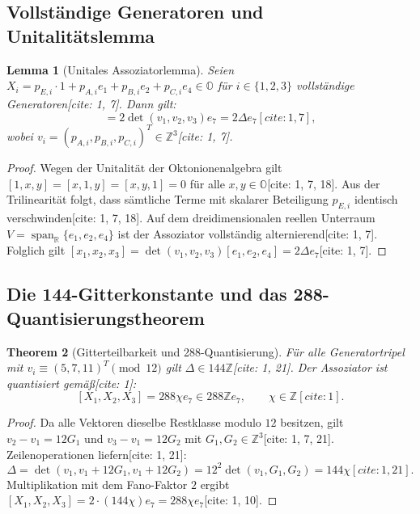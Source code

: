 \documentclass[11pt,a4paper]{article}
\newtheorem{theorem}{Theorem}[section]
\newtheorem{lemma}[theorem]{Lemma}
\theoremstyle{definition}
\theoremstyle{remark}
\begin{document}
\subsection{Vollständige Generatoren und Unitalitätslemma}
\begin{lemma}[Unitales Assoziatorlemma]
Seien $X_i = p_{E,i} \cdot 1 + p_{A,i} e_1 + p_{B,i} e_2 + p_{C,i} e_4 \in \mathbb{O}$ für $i \in \{1, 2, 3\}$ vollständige Generatoren[cite: 1, 7]. Dann gilt:
\begin{equation}
[X_1, X_2, X_3] = 2 \det(v_1, v_2, v_3) e_7 = 2\Delta e_7[cite: 1, 7],
\end{equation}
wobei $v_i = (p_{A,i}, p_{B,i}, p_{C,i})^T \in \mathbb{Z}^3$[cite: 1, 7].
\end{lemma}
\begin{proof}
Wegen der Unitalität der Oktonionenalgebra gilt $[1, x, y] = [x, 1, y] = [x, y, 1] = 0$ für alle $x, y \in \mathbb{O}$[cite: 1, 7, 18]. Aus der Trilinearität folgt, dass sämtliche Terme mit skalarer Beteiligung $p_{E,i}$ identisch verschwinden[cite: 1, 7, 18]. Auf dem dreidimensionalen reellen Unterraum $V = \operatorname{span}_{\mathbb{R}}\{e_1, e_2, e_4\}$ ist der Assoziator vollständig alternierend[cite: 1, 7]. Folglich gilt $[x_1, x_2, x_3] = \det(v_1, v_2, v_3)[e_1, e_2, e_4] = 2\Delta e_7$[cite: 1, 7].
\end{proof}

\subsection{Die 144-Gitterkonstante und das 288-Quantisierungstheorem}
\begin{theorem}[Gitterteilbarkeit und 288-Quantisierung]
Für alle Generatortripel mit $v_i \equiv (5, 7, 11)^T \pmod{12}$ gilt $\Delta \in 144\mathbb{Z}$[cite: 1, 21]. Der Assoziator ist quantisiert gemäß[cite: 1]:
\begin{equation}
\boxed{[X_1, X_2, X_3] = 288 \chi e_7 \in 288\mathbb{Z}e_7, \qquad \chi \in \mathbb{Z}}[cite: 1].
\end{equation}
\end{theorem}
\begin{proof}
Da alle Vektoren dieselbe Restklasse modulo $12$ besitzen, gilt $v_2 - v_1 = 12G_1$ und $v_3 - v_1 = 12G_2$ mit $G_1, G_2 \in \mathbb{Z}^3$[cite: 1, 7, 21]. Zeilenoperationen liefern[cite: 1, 21]:
\begin{equation}
\Delta = \det(v_1, v_1 + 12G_1, v_1 + 12G_2) = 12^2 \det(v_1, G_1, G_2) = 144 \chi[cite: 1, 21].
\end{equation}
Multiplikation mit dem Fano-Faktor $2$ ergibt $[X_1, X_2, X_3] = 2 \cdot (144\chi) e_7 = 288\chi e_7$[cite: 1, 10].
\end{proof}
\end{document}
